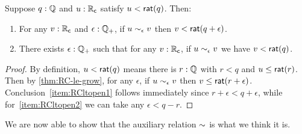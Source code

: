 \begin{lem}\label{thm:RC-lt-open}
  Suppose $q:\mathbb{Q}$ and $u:\mathbb{R}_\mathsf{c}$ satisfy $u<\mathsf{rat}(q)$.  Then:
  \begin{enumerate}
  \item For any $v:\mathbb{R}_\mathsf{c}$ and $\epsilon:\mathbb{Q}_{+}$, if $u\sim_{\epsilon} v$ then $v< \mathsf{rat}(q+\epsilon)$.\label{item:RCltopen1}
  \item There exists $\epsilon:\mathbb{Q}_{+}$ such that for any $v:\mathbb{R}_\mathsf{c}$, if $u\sim_{\epsilon} v$ we have $v<\mathsf{rat}(q)$.\label{item:RCltopen2}
  \end{enumerate}
\end{lem}
\begin{proof}
  By definition, $u<\mathsf{rat}(q)$ means there is $r:\mathbb{Q}$ with $r<q$ and $u\le \mathsf{rat}(r)$.
  Then by \autoref{thm:RC-le-grow}, for any $\epsilon$, if $u\sim_{\epsilon} v$ then $v\le \mathsf{rat}(r+\epsilon)$.
  Conclusion~\ref{item:RCltopen1} follows immediately since $r+\epsilon<q+\epsilon$, while for~\ref{item:RCltopen2} we can take any $\epsilon <q-r$.
\end{proof}

We are now able to show that the auxiliary relation $\mathord\sim$ is what we think it is.

